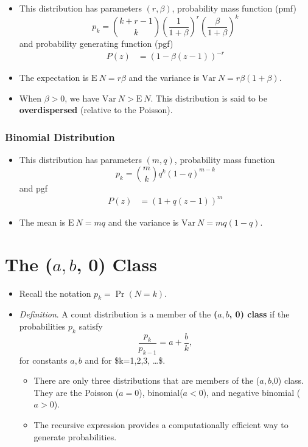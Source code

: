 \documentclass[]{book}
\begin{document}
\begin{itemize}
\item
  This distribution has parameters \((r, \beta)\), probability mass
  function (pmf)
  \[p_k = {k+r-1\choose k} \left(\frac{1}{1+\beta}\right)^r \left(\frac{\beta}{1+\beta}\right)^k\]
  and probability generating function (pgf) \[\begin{aligned}
  P(z) &= (1-\beta(z-1))^{-r} \end{aligned}\]
\item
  The expectation is \(\mathrm{E~}N = r\beta\) and the variance is
  \(\mathrm{Var~}N = r\beta(1+\beta)\).
\item
  When \(\beta>0\), we have \(\mathrm{Var~}N >\mathrm{E~}N\). This
  distribution is said to be \textbf{overdispersed} (relative to the
  Poisson).
\end{itemize}

\subsubsection{Binomial Distribution}\label{binomial-distribution}

\begin{itemize}
\item
  This distribution has parameters \((m,q)\), probability mass function
  \[p_k = {m\choose k} q^k (1-q)^{m-k}\] and pgf \[\begin{aligned}
  P(z) &= (1+q(z-1))^m\end{aligned}\]
\item
  The mean is \(\mathrm{E~}N = mq\) and the variance is
  \(\mathrm{Var~}N = mq(1-q)\).
\end{itemize}

\section{\texorpdfstring{The (\(a, b\), 0)
Class}{The (a, b, 0) Class}}\label{the-a-b-0-class}

\begin{itemize}
\item
  Recall the notation \(p_k= \Pr(N = k)\).
\item
  \emph{Definition}. A count distribution is a member of the
  \textbf{(\(a, b\), 0) class} if the probabilities \(p_k\) satisfy
  \[\frac{p_k}{p_{k-1}}=a+\frac{b}{k},\] for constants \(a,b\) and for
  \$k=1,2,3, \ldots \$.

  \begin{itemize}
  \item
    There are only three distributions that are members of the
    (\(a,b\),0) class. They are the Poisson (\(a=0\)),
    binomial(\(a<0\)), and negative binomial (\(a>0\)).
  \item
    The recursive expression provides a computationally efficient way to
    generate probabilities.
  \end{itemize}
\end{itemize}
\end{document}
